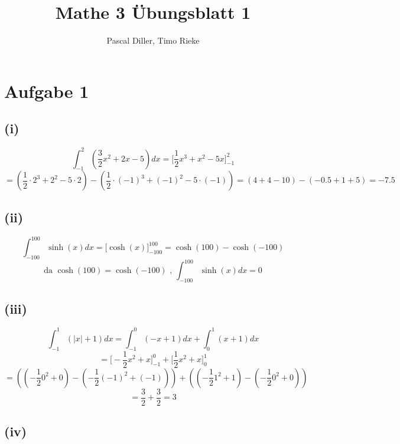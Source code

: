\documentclass{article}
\title{Mathe 3 Übungsblatt 1}
\author{Pascal Diller, Timo Rieke}
\date{}
\begin{document}
\maketitle

\section*{Aufgabe 1}
\subsection*{(i)}

\[\int^{2}_{-1} \left( \frac{3}{2} x^2 + 2x - 5\right)dx = \bigl[ \frac{1}{2}x^3 + x^2 - 5x \bigr]^2_{-1}\]
\[ = (\frac{1}{2} \cdot 2^3 + 2^2 - 5 \cdot 2) - (\frac{1}{2} \cdot (-1)^3 + (-1)^2 - 5 \cdot (-1) ) = (4+4-10)-(-0.5 +1 + 5) = - 7.5\]

\subsection*{(ii)}
\[ \int^{100}_{-100} \sinh (x) dx= \bigl[ \cosh (x) \bigr]^{100}_{-100} = \cosh(100)-\cosh(-100) \]
\[ \text{da } \cosh(100) = \cosh(-100) \text{ , }\int^{100}_{-100} \sinh (x) dx= 0\]

\subsection*{(iii)}
\[\int^1_{-1}(|x| + 1) dx = \int^0_{-1}(-x + 1) dx + \int^1_0 (x + 1) dx\]
\[= \bigl[ -\frac{1}{2}x^2 + x \bigr]^0_{-1} + \bigl[\frac{1}{2}x^2 + x\bigr]^1_0\]
\[= \left(\left( -\frac{1}{2}0^2 + 0 \right) - \left( -\frac{1}{2}(-1)^2 + (-1) \right) \right)  + \left(\left( -\frac{1}{2}1^2 + 1 \right) - \left( -\frac{1}{2}0^2 + 0 \right) \right)\]
\[= \frac{3}{2} + \frac{3}{2} = 3\]

\subsection*{(iv)}
\end{document}
